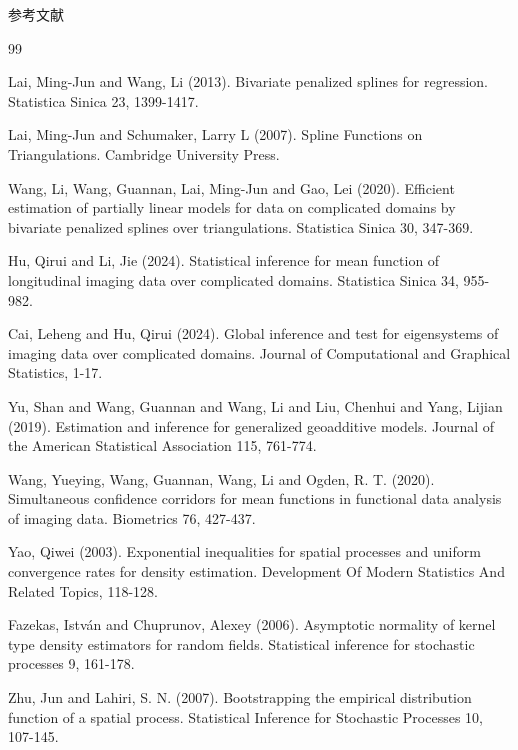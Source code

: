 \documentclass{beamer}
\begin{document}
\begin{frame}{参考文献}
\tiny
\begin{thebibliography}{99}

Lai, Ming-Jun and Wang, Li (2013). Bivariate penalized splines for regression. Statistica Sinica 23, 1399-1417.

Lai, Ming-Jun and Schumaker, Larry L (2007). Spline Functions on Triangulations. Cambridge University Press.

Wang, Li, Wang, Guannan, Lai, Ming-Jun and Gao, Lei (2020). Efficient estimation of partially linear models for data on complicated domains by bivariate penalized splines over triangulations. Statistica Sinica 30, 347-369.

Hu, Qirui and Li, Jie (2024). Statistical inference for mean function of longitudinal imaging data over complicated domains. Statistica Sinica 34, 955-982.

Cai, Leheng and Hu, Qirui (2024). Global inference and test for eigensystems of imaging data over complicated domains. Journal of Computational and Graphical Statistics, 1-17.

Yu, Shan and Wang, Guannan and Wang, Li and Liu, Chenhui and Yang, Lijian (2019). Estimation and inference for generalized geoadditive models. Journal of the American Statistical Association 115, 761-774.

Wang, Yueying, Wang, Guannan, Wang, Li and Ogden, R. T. (2020). Simultaneous confidence corridors for mean functions in functional data analysis of imaging data. Biometrics 76, 427-437.

Yao, Qiwei (2003). Exponential inequalities for spatial processes and uniform convergence rates for density estimation. Development Of Modern Statistics And Related Topics, 118-128.

Fazekas, Istv{\'a}n and Chuprunov, Alexey (2006). Asymptotic normality of kernel type density estimators for random fields. Statistical inference for stochastic processes 9, 161-178.

Zhu, Jun and Lahiri, S. N. (2007). Bootstrapping the empirical distribution function of a spatial process. Statistical Inference for Stochastic Processes 10, 107-145.

\end{thebibliography}
\end{frame}
\end{document}
